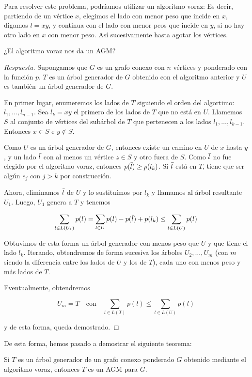 Para resolver este problema, podríamos utilizar un algoritmo voraz: Es decir, partiendo de un vértice $x$, elegimos el lado con menor peso que incide en $x$, digamos $l = xy$, y continua con el lado con menor peos que incide en $y$, si no hay otro lado en $x$ con menor peso. Así sucesivamente hasta agotar los vértices.

\begin{pre}
    ¿El algoritmo voraz nos da un AGM?
\end{pre}

\begin{proof}[Respuesta]
    Supongamos que $G$ es un grafo conexo con $n$ vértices y ponderado con la función $p$. $T$ es un árbol generador de $G$ obtenido con el algoritmo anterior y $U$ es también un árbol generador de $G$.
    
    En primer lugar, enumeremos los lados de $T$ siguiendo el orden del algortimo: $l_1, \dots, l_{n-1}$. Sea $l_k = xy$ el primero de los lados de $T$ que no está en $U$. Llamemos $S$ al conjunto de vértices del subárbol de $T$ que pertenecen a los lados $l_1, \dots, l_{k-1}$. Entonces $x \in S$ e $y \notin S$.
    
    Como $U$ es un árbol generador de $G$, entonces existe un camino en $U$ de $x$ hasta $y$, y un lado $\Bar{l}$ con al menos un vértice $z \in S$ y otro fuera de $S$. Como $\Bar{l}$ no fue elegido por el algoritmo voraz, entonces $p(\Bar{l}) \geq p(l_k)$. Si $\Bar{l}$ está en $T$, tiene que ser algún $e_j$ con $j>k$ por construcción.
    
    Ahora, eliminamos $\Bar{l}$ de $U$ y lo sustituímos por $l_k$ y llamamos al árbol resultante $U_1$. Luego, $U_1$ genera a $T$ y tenemos
    
    \[
    \sum_{l \in L(U_1)} p(l) = \sum_{l \in U} p(l) - p(\Bar{l}) + p(l_k) \leq \sum_{l \in L(U)} p(l)
    \]
    
    Obtuvimos de esta forma un árbol generador con menos peso que $U$ y que tiene el lado $l_k$. Iterando, obtendremos de forma sucesiva los árboles $U_2, \dots, U_m$ (con $m$ siendo la diferencia entre los lados de $U$ y los de $T$), cada uno con menos peso y más lados de $T$.
    
    Eventualmente, obtendremos 
    
    \[
    U_m = T \quad \text{con} \quad \sum_{l \in L(T)} p(l) \leq \sum_{l \in L(U)} p(l)
    \]
    
    \noindent y de esta forma, queda demostrado.
\end{proof}

De esta forma, hemos pasado a demostrar el siguiente teorema:

\begin{teo}
    Si $T$ es un árbol generador de un grafo conexo ponderado $G$ obtenido mediante el algoritmo voraz, entonces $T$ es un AGM para $G$.
\end{teo}